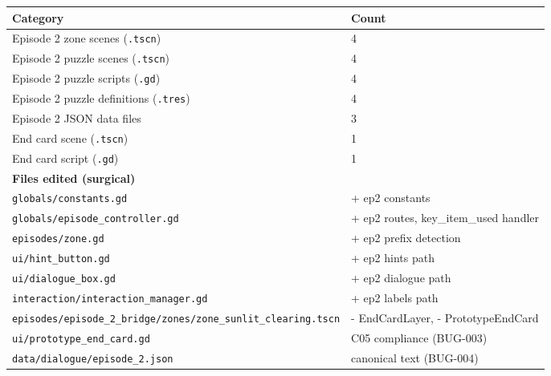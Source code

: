 \documentclass[12pt, a4paper]{article}
\begin{document}
\begin{center}
\begin{tabular}{ll}
\toprule
\textbf{Category} & \textbf{Count} \\
\midrule
Episode 2 zone scenes (\texttt{.tscn})         & 4 \\
Episode 2 puzzle scenes (\texttt{.tscn})       & 4 \\
Episode 2 puzzle scripts (\texttt{.gd})        & 4 \\
Episode 2 puzzle definitions (\texttt{.tres})  & 4 \\
Episode 2 JSON data files                      & 3 \\
End card scene (\texttt{.tscn})                & 1 \\
End card script (\texttt{.gd})                 & 1 \\
\midrule
\textbf{Files edited (surgical)} &  \\
\quad \texttt{globals/constants.gd}                                       & + ep2 constants \\
\quad \texttt{globals/episode\_controller.gd}                             & + ep2 routes, key\_item\_used handler \\
\quad \texttt{episodes/zone.gd}                                           & + ep2 prefix detection \\
\quad \texttt{ui/hint\_button.gd}                                         & + ep2 hints path \\
\quad \texttt{ui/dialogue\_box.gd}                                        & + ep2 dialogue path \\
\quad \texttt{interaction/interaction\_manager.gd}                        & + ep2 labels path \\
\quad \texttt{episodes/episode\_2\_bridge/zones/zone\_sunlit\_clearing.tscn} & - EndCardLayer, - PrototypeEndCard \\
\quad \texttt{ui/prototype\_end\_card.gd}                                 & C05 compliance (BUG-003) \\
\quad \texttt{data/dialogue/episode\_2.json}                              & canonical text (BUG-004) \\
\bottomrule
\end{tabular}
\end{center}
\end{document}
